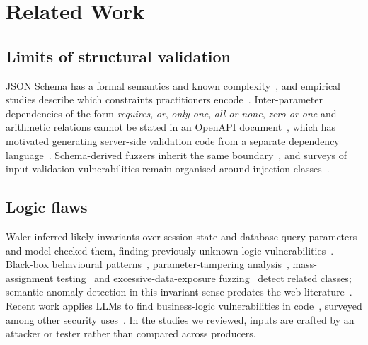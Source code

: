 \documentclass[conference]{IEEEtran}
\begin{document}
\section{Related Work}
\label{sec:related}

\subsection{Limits of structural validation}
JSON Schema has a formal semantics and known complexity~\cite{pezoa2016foundations,attouche2023jsonschema},
and empirical studies describe which constraints practitioners encode~\cite{baazizi2021usagenot}.
Inter-parameter dependencies of the form \emph{requires}, \emph{or}, \emph{only-one},
\emph{all-or-none}, \emph{zero-or-one} and arithmetic relations cannot be stated in an OpenAPI
document~\cite{martinlopez2022idl,martinlopez2019catalogue}, which has motivated generating
server-side validation code from a separate dependency language~\cite{barakat2023idlgen}.
Schema-derived fuzzers inherit the same boundary~\cite{hatfielddodds2021schemathesis}, and surveys of
input-validation vulnerabilities remain organised around injection classes~\cite{fadlalla2023inputvalidation}.

\subsection{Logic flaws}
Waler inferred likely invariants over session state and database query parameters and model-checked
them, finding previously unknown logic vulnerabilities~\cite{felmetsger2010waler}. Black-box
behavioural patterns~\cite{pellegrino2014logicflaws}, parameter-tampering
analysis~\cite{bisht2010notamper}, mass-assignment testing~\cite{corradini2023massassignment} and
excessive-data-exposure fuzzing~\cite{pan2024edefuzz} detect related classes; semantic anomaly
detection in this invariant sense predates the web literature~\cite{raz2002semanticanomaly}. Recent
work applies LLMs to find business-logic vulnerabilities in code~\cite{metin2025blv,armillotta2026antaeus},
surveyed among other security uses~\cite{sheng2025llmsecsurvey}. In the studies we reviewed, inputs are
crafted by an attacker or tester rather than compared across producers.
\end{document}
